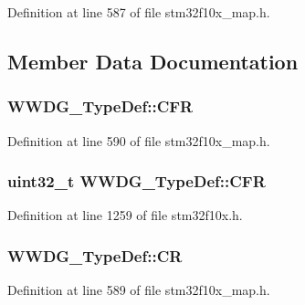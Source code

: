 Definition at line 587 of file stm32f10x\+\_\+map.\+h.



\subsection{Member Data Documentation}
\subsubsection[{\texorpdfstring{C\+FR}{CFR}}]{ W\+W\+D\+G\+\_\+\+Type\+Def\+::\+C\+FR}\hypertarget{struct_w_w_d_g___type_def_ad2187f55255b7698eebcf2153039119c}{}\label{struct_w_w_d_g___type_def_ad2187f55255b7698eebcf2153039119c}


Definition at line 590 of file stm32f10x\+\_\+map.\+h.

\subsubsection[{\texorpdfstring{C\+FR}{CFR}}]{ {\bf uint32\+\_\+t} W\+W\+D\+G\+\_\+\+Type\+Def\+::\+C\+FR}\hypertarget{struct_w_w_d_g___type_def_adcd6a7e5d75022e46ce60291f4b8544c}{}\label{struct_w_w_d_g___type_def_adcd6a7e5d75022e46ce60291f4b8544c}


Definition at line 1259 of file stm32f10x.\+h.

\subsubsection[{\texorpdfstring{CR}{CR}}]{ W\+W\+D\+G\+\_\+\+Type\+Def\+::\+CR}\hypertarget{struct_w_w_d_g___type_def_a2d6842abca42c08d9bc8198bbe6466c1}{}\label{struct_w_w_d_g___type_def_a2d6842abca42c08d9bc8198bbe6466c1}


Definition at line 589 of file stm32f10x\+\_\+map.\+h.

